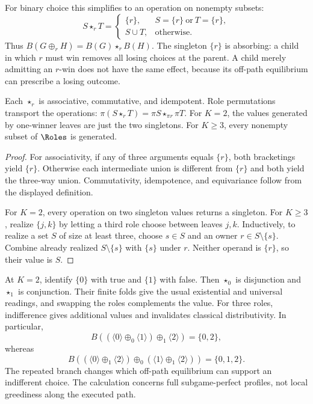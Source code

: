 For binary choice this simplifies to an operation on nonempty subsets:
\[
 S\mathbin{\star_r}T=
 \begin{cases}
 \{r\},&S=\{r\}\ \text{or}\ T=\{r\},\\
 S\cup T,&\text{otherwise}.
 \end{cases}
\]
Thus $B(G\oplus_r H)=B(G)\star_r B(H)$.
The singleton $\{r\}$ is absorbing: a child in which $r$ must win removes
all losing choices at the parent. A child merely admitting an $r$-win
does not have the same effect, because its off-path equilibrium can
prescribe a losing outcome.

\begin{lemma}
\label{lem:rational-algebra}
Each $\star_r$ is associative, commutative, and idempotent.
Role permutations transport the operations:
$\pi(S\star_r T)=\pi S\star_{\pi r}\pi T$.
For $K=2$, the values generated by one-winner leaves are just the two
singletons. For $K\ge3$, every nonempty subset of $\Roles$ is generated.
\end{lemma}
\begin{proof}
For associativity, if any of three arguments equals $\{r\}$, both
bracketings yield $\{r\}$. Otherwise each intermediate union is different
from $\{r\}$ and both yield the three-way union. Commutativity,
idempotence, and equivariance follow from the displayed definition.

For $K=2$, every operation on two singleton values returns a singleton.
For $K\ge3$, realize $\{j,k\}$ by letting a third role choose between
leaves $j,k$. Inductively, to realize a set $S$ of size at least three,
choose $s\in S$ and an owner $r\in S\setminus\{s\}$.
Combine already realized $S\setminus\{s\}$ with $\{s\}$ under $r$.
Neither operand is $\{r\}$, so their value is $S$.
\end{proof}

At $K=2$, identify $\{0\}$ with true and $\{1\}$ with false.
Then $\star_0$ is disjunction and $\star_1$ is conjunction.
Their finite folds give the usual existential and universal readings,
and swapping the roles complements the value.
For three roles, indifference gives additional values and invalidates
classical distributivity. In particular,
\[
 B((\langle0\rangle\oplus_0\langle1\rangle)
                  \oplus_1\langle2\rangle)=\{0,2\},
\]
whereas
\[
 B((\langle0\rangle\oplus_1\langle2\rangle)
           \oplus_0(\langle1\rangle\oplus_1\langle2\rangle))
       =\{0,1,2\}.
\]
The repeated branch changes which off-path equilibrium can support an
indifferent choice. The calculation concerns full subgame-perfect
profiles, not local greediness along the executed path.

